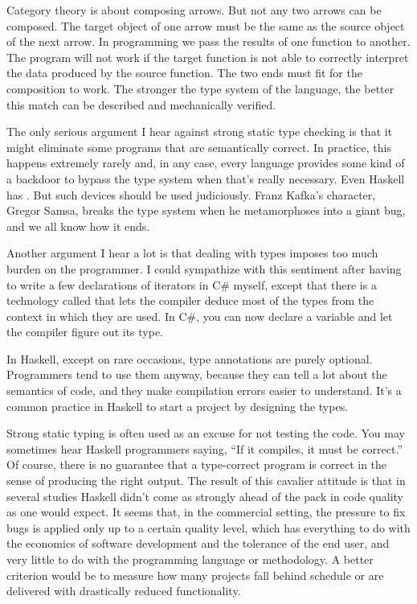Category theory is about composing arrows. But not any two arrows can be
composed. The target object of one arrow must be the same as the source
object of the next arrow. In programming we pass the results of
one function to another. The program will not work if the target
function is not able to correctly interpret the data produced by the
source function. The two ends must fit for the composition to work. The
stronger the type system of the language, the better this match can be
described and mechanically verified.

The only serious argument I hear against strong static type checking is
that it might eliminate some programs that are semantically correct. In
practice, this happens extremely rarely and, in any case, every language
provides some kind of a backdoor to bypass the type system when that's
really necessary. Even Haskell has . But such
devices should be used judiciously. Franz Kafka's character, Gregor
Samsa, breaks the type system when he metamorphoses into a giant bug,
and we all know how it ends.

Another argument I hear a lot is that dealing with types imposes too
much burden on the programmer. I could sympathize with this sentiment
after having to write a few declarations of iterators in C\# myself,
except that there is a technology called  that lets
the compiler deduce most of the types from the context in which they are
used. In C\#, you can now declare a variable  and let the
compiler figure out its type.

In Haskell, except on rare occasions, type annotations are purely
optional. Programmers tend to use them anyway, because they can tell a
lot about the semantics of code, and they make compilation errors easier
to understand. It's a common practice in Haskell to start a project by
designing the types. 

Strong static typing is often used as an excuse for not testing the
code. You may sometimes hear Haskell programmers saying, ``If it
compiles, it must be correct.'' Of course, there is no guarantee that a
type-correct program is correct in the sense of producing the right
output. The result of this cavalier attitude is that in several studies
Haskell didn't come as strongly ahead of the pack in code quality as one
would expect. It seems that, in the commercial setting, the pressure to
fix bugs is applied only up to a certain quality level, which has
everything to do with the economics of software development and the
tolerance of the end user, and very little to do with the programming
language or methodology. A better criterion would be to measure how many
projects fall behind schedule or are delivered with drastically reduced
functionality.

